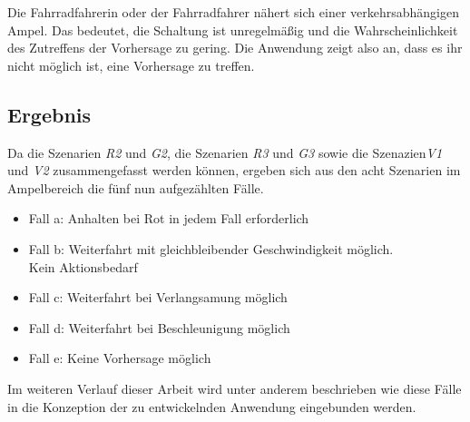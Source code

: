 \centerline{\grayRule}
\begin{description}[leftmargin=0.7cm,style=nextline]
\item[Szenario V2:] 
Die Fahrradfahrerin oder der Fahrradfahrer nähert sich einer verkehrsabhängigen Ampel. Das bedeutet, die Schaltung ist unregelmäßig und die Wahrscheinlichkeit des Zutreffens der Vorhersage zu gering. Die Anwendung zeigt also an, dass es ihr nicht möglich ist, eine Vorhersage zu treffen.\\ 
\end{description} %
\subsection*{Ergebnis}
Da die Szenarien \textit{R2} und \textit{G2}, die Szenarien \textit{R3} und \textit{G3} sowie die Szenazien\textit{V1} und \textit{V2} zusammengefasst werden können, ergeben sich aus den acht Szenarien im Ampelbereich die fünf nun aufgezählten Fälle.
\begin{itemize}
	\item Fall a: Anhalten bei Rot in jedem Fall erforderlich
	\item Fall b: Weiterfahrt mit gleichbleibender Geschwindigkeit möglich.\\ Kein Aktionsbedarf
	\item Fall c: Weiterfahrt bei Verlangsamung möglich
	\item Fall d: Weiterfahrt bei Beschleunigung möglich
	\item Fall e: Keine Vorhersage möglich
\end{itemize}
Im weiteren Verlauf dieser Arbeit wird unter anderem beschrieben wie diese Fälle in die Konzeption der zu entwickelnden Anwendung eingebunden werden.
